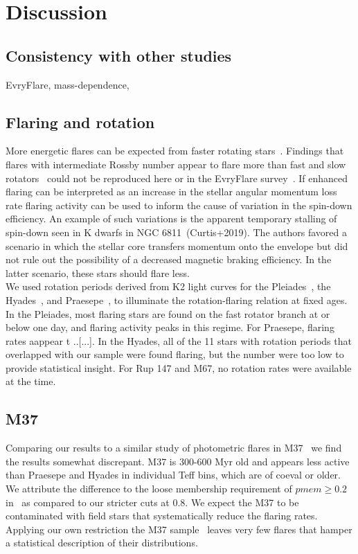 \documentclass{aa}
\begin{document}
\section{Discussion}
\subsection{Consistency with other studies}
EvryFlare, mass-dependence,
\subsection{Flaring and rotation}
More energetic flares can be expected from faster rotating stars~\citep{candelaresi_superflare_2014, doorsselaere_stellar_2017, yang_flaring_2017}. Findings that flares with intermediate Rossby number appear to flare more than fast and slow rotators~\citep{mondrik_flarerotation_2019} could not be reproduced here or in the EvryFlare survey~\citep{howard_evryflare2arxiv_2019}. If enhanced flaring can be interpreted as an increase in the stellar angular momentum loss rate flaring activity can be used to inform the cause of variation in the spin-down efficiency. An example of such variations is the apparent temporary stalling of spin-down seen in K dwarfs in NGC 6811~(Curtis+2019). The authors favored a scenario in which the stellar core transfers momentum onto the envelope but did not rule out the possibility of a decreased magnetic braking efficiency. In the latter scenario, these stars should flare less. %
\\
We used rotation periods derived from K2 light curves for the Pleiades~\citep{rebull_pleiadesrot_2016}, the Hyades~\citep{douglas_hyadesrot_2016}, and Praesepe~\citep{rebull_praesepe_2017}, to illuminate the rotation-flaring relation at fixed ages. In the Pleiades, most flaring stars are found on the fast rotator branch at or below one day, and flaring activity peaks in this regime. For Praesepe, flaring rates aappear t ..[...]. In the Hyades, all of the 11 stars with rotation periods that overlapped with our sample were found flaring, but the number were too low to provide statistical insight. For Rup 147 and M67, no rotation rates were available at the time.
 \subsection{M37}
Comparing our results to a similar study of photometric flares in M37~\citep{chang_photometric_2015} we find the results somewhat discrepant. M37 is 300-600 Myr old and appears less active than Praesepe and Hyades in individual Teff bins, which are of coeval or older. We attribute the difference to the loose membership requirement of $pmem \geq 0.2$ in~\cite{chang_photometric_2015} as compared to our stricter cuts at 0.8. We expect the M37 to be contaminated with field stars that systematically reduce the flaring rates. Applying our own restriction the M37 sample~\citep{chang_photometric_2015_data} leaves very few flares that hamper a statistical description of their distributions.
\end{document}

